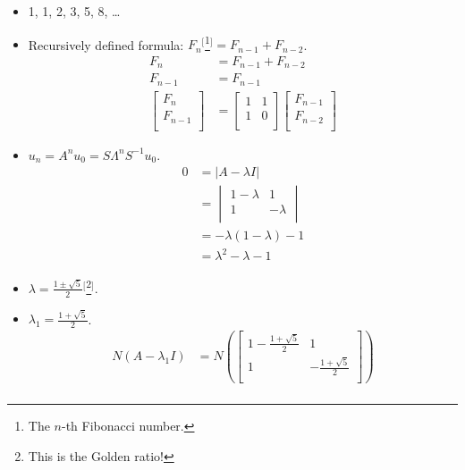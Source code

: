 \documentclass{article}
\begin{document}
\begin{itemize}
    \item {}1, 1, 2, 3, 5, 8, \dots
    \item Recursively defined formula: $F_n$$^[$\footnote{The $n$-th Fibonacci number.}$^]$$=F_{n-1}+F_{n-2}$.
    \begin{align*}
        F_n &= F_{n-1}+F_{n-2}\\
        F_{n-1} &= F_{n-1}\\
        \begin{bmatrix}
            F_n\\
            F_{n-1}\\
        \end{bmatrix}
        &=
        \begin{bmatrix}
            1 & 1\\
            1 & 0\\
        \end{bmatrix}
        \begin{bmatrix}
            F_{n-1}\\
            F_{n-2}\\
        \end{bmatrix}
    \end{align*}
    \item $u_n = A^nu_0 = S\Lambda^nS^{-1}u_0$.
    \begin{align*}
        0 &= |A-\lambda I|\\
        &=
        \begin{vmatrix}
            1-\lambda & 1\\
            1 & -\lambda\\
        \end{vmatrix}\\
        &= -\lambda(1-\lambda)-1\\
        &= \lambda^2-\lambda-1
    \end{align*}
    \item $\lambda = \frac{1\pm\sqrt{5}}{2}$$^[$\footnote{This is the Golden ratio!}$^]$.
    \item $\lambda_1 = \frac{1+\sqrt{5}}{2}$.
    \begin{align*}
        N(A-\lambda_1I) &= N\left(
        \begin{bmatrix}
            1-\frac{1+\sqrt{5}}{2} & 1\\
            1 & -\frac{1+\sqrt{5}}{2}\\
        \end{bmatrix}
        \right)\\

\end{align*}$$
\end{itemize}
\end{document}
